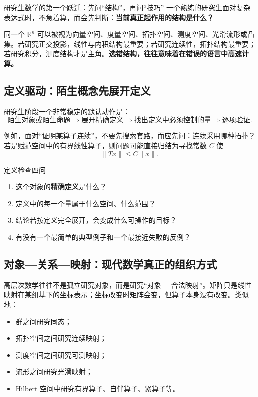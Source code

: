 \documentclass[11pt,a4paper]{ctexart}
\newcommand{\arrowchain}{\ensuremath{\Longrightarrow}}
\newcommand{\R}{\mathbb{R}}
\begin{document}
\begin{researchbox}{研究生数学的第一个跃迁：先问“结构”，再问“技巧”}
一个熟练的研究生面对复杂表达式时，不急着算，而会先判断：\textbf{当前真正起作用的结构是什么？}

同一个 $\R^n$ 可以被视为向量空间、度量空间、拓扑空间、测度空间、光滑流形或凸集。若研究正交投影，线性与内积结构最重要；若研究连续性，拓扑结构最重要；若研究积分，测度结构才是主角。\textbf{选错结构，往往意味着在错误的语言中高速计算。}
\end{researchbox}

\subsection{定义驱动：陌生概念先展开定义}

研究生阶段一个非常稳定的默认动作是：
\[
\text{陌生对象或陌生命题}
\arrowchain
\text{展开精确定义}
\arrowchain
\text{找出定义中必须控制的量}
\arrowchain
\text{逐项验证}.
\]

例如，面对“证明某算子连续”，不要先搜索套路，而应先问：连续采用哪种拓扑？若是赋范空间中的有界线性算子，则问题可能直接归结为寻找常数 $C$ 使
\[
\|Tx\|\le C\|x\|.
\]

\begin{checkbox}{定义检查四问}
\begin{enumerate}
  \item 这个对象的\textbf{精确定义}是什么？
  \item 定义中的每一个量属于什么空间、什么范围？
  \item 结论若按定义完全展开，会变成什么可操作的目标？
  \item 有没有一个最简单的典型例子和一个最接近失败的反例？
\end{enumerate}
\end{checkbox}

\subsection{对象—关系—映射：现代数学真正的组织方式}

高层次数学往往不是孤立研究对象，而是研究“对象 + 合法映射”。矩阵只是线性映射在某组基下的坐标表示；坐标改变时矩阵会变，但算子本身没有改变。类似地：
\begin{itemize}
  \item 群之间研究同态；
  \item 拓扑空间之间研究连续映射；
  \item 测度空间之间研究可测映射；
  \item 流形之间研究光滑映射；
  \item Hilbert 空间中研究有界算子、自伴算子、紧算子等。
\end{itemize}
\end{document}
